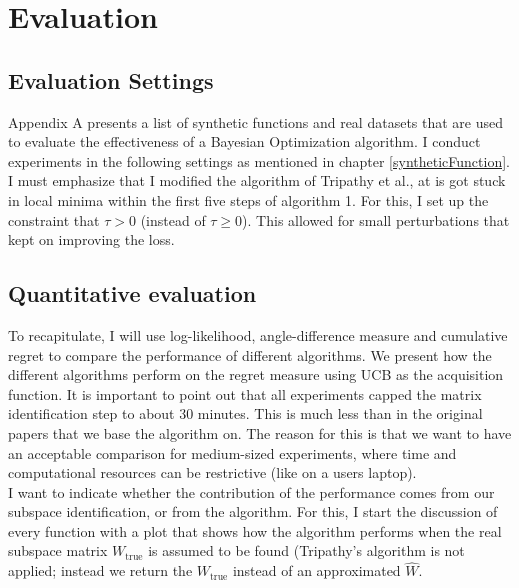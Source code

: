 \chapter{Evaluation}

\ifpdf
    \graphicspath{{07_Chapter6/Figs/Raster/}{07_Chapter6/Figs/PDF/}{07_Chapter6/Figs/}}
\else
    \graphicspath{{07_Chapter6/Figs/Vector/}{07_Chapter6/Figs/}}
\fi

\section{Evaluation Settings}

Appendix A presents a list of synthetic functions and real datasets that are used to evaluate the effectiveness of a Bayesian Optimization algorithm. 
I conduct experiments in the following settings as mentioned in chapter \ref{syntheticFunction}.
I must emphasize that I modified the algorithm of Tripathy et al., at is got stuck in local minima within the first five steps of algorithm 1.
For this, I set up the constraint that $\tau > 0$ (instead of $\tau \geq 0$). 
This allowed for small perturbations that kept on improving the loss.

\section{Quantitative evaluation}
To recapitulate, I will use log-likelihood, angle-difference measure and cumulative regret to compare the performance of different algorithms.
We present how the different algorithms perform on the regret measure using UCB as the acquisition function.
It is important to point out that all experiments capped the matrix identification step to about 30 minutes.
This is much less than in the original papers that we base the algorithm on.
The reason for this is that we want to have an acceptable comparison for medium-sized experiments, where time and computational resources can be restrictive (like on a users laptop). \\

I want to indicate whether the contribution of the performance comes from our subspace identification, or from the algorithm. 
For this, I start the discussion of every function with a plot that shows how the algorithm performs when the real subspace matrix $W_{\text{true}}$ is assumed to be found (Tripathy's algorithm is not applied; instead we return the $W_{\text{true}}$ instead of an approximated $\hat{W}$. \\

